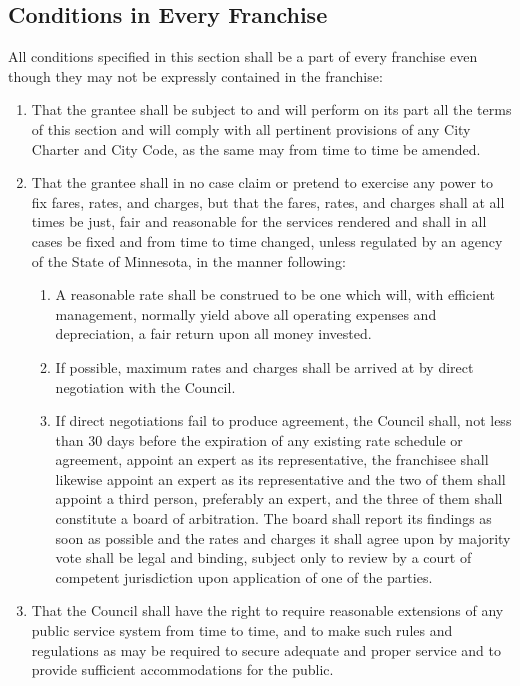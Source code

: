 \subsection{Conditions in Every Franchise}
All conditions specified in this section shall be a part of every franchise even though they may not be expressly contained in the franchise:
\begin{enumerate}
    \item That the grantee shall be subject to and will perform on its part all the terms of this section and will comply with all pertinent provisions of any City Charter and City Code, as the same may from time to time be amended.
    \item That the grantee shall in no case claim or pretend to exercise any power to fix fares, rates, and charges, but that the fares, rates, and charges shall at all times be just, fair and reasonable for the services rendered and shall in all cases be fixed and from time to time changed, unless regulated by an agency of the State of Minnesota, in the manner following:
    \begin{enumerate}
        \item A reasonable rate shall be construed to be one which will, with efficient management, normally yield above all operating expenses and depreciation, a fair return upon all money invested.
        \item If possible, maximum rates and charges shall be arrived at by direct negotiation with the Council.
        \item If direct negotiations fail to produce agreement, the Council shall, not less than 30 days before the expiration of any existing rate schedule or agreement, appoint an expert as its representative, the franchisee shall likewise appoint an expert as its representative and the two of them shall appoint a third person, preferably an expert, and the three of them shall constitute a board of arbitration. The board shall report its findings as soon as possible and the rates and charges it shall agree upon by majority vote shall be legal and binding, subject only to review by a court of competent jurisdiction upon application of one of the parties.
    \end{enumerate}
    \item That the Council shall have the right to require reasonable extensions of any public service system from time to time, and to make such rules and regulations as may be required to secure adequate and proper service and to provide sufficient accommodations for the public.

\end{enumerate}
